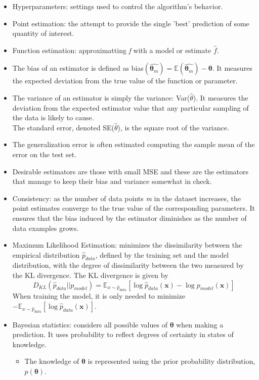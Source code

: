 \documentclass{article}
\begin{document}
\begin{itemize}
\item Hyperparameters: settings used to control the algorithm's behavior.
\item Point estimation: the attempt to provide the single 'best' prediction of some quantity of interest.
\item Function estimation: approximatting \textit{f} with a model or estimate \(\hat{f}\).
\item The bias of an estimator is defined as bias\((\hat{\boldsymbol{\theta}_m}) = \mathbb{E}(\hat{\boldsymbol{\theta}_m}) - \boldsymbol{\theta}\). It measures the expected deviation from the true value of the function or parameter.
\item The variance of an estimator is simply the variance: Var(\(\hat{\theta}\)). It measures the deviation from the expected estimator value that any particular sampling of the data is likely to cause.\\ The standard error, denoted SE(\(\hat{\theta}\)), is the square root of the variance.
\item The generalization error is often estimated computing the sample mean of the error on the test set.
\item Desirable estimators are those with small MSE and these are the estimators that manage to keep their bias and variance somewhat in check.
\item Consistency: as the number of data points \textit{m} in the dataset increases, the point estimates converge to the true value of the corresponding parameters. It ensures that the bias induced by the estimator diminishes as the number of data examples grows.
\item Maximum Likelihood Estimation: minimizes the dissimilarity between the empirical distribution \(\hat{p}_{data}\), defined by the training set and the model distribution, with the degree of dissimilarity between the two measured by the KL divergence. The KL divergence is given by
\[
	D_{KL}(\hat{p}_{data}||p_{model}) = \mathbb{E}_{x\sim \hat{p}_{data}}[\log{\hat{p}_{data}}(\boldsymbol{x}) - \log{p_{model}(\boldsymbol{x})}]
\]
When training the model, it is only needed to minimize \(-\mathbb{E}_{x\sim \hat{p}_{data}}[\log{\hat{p}_{data}}(\boldsymbol{x})]\).
\item Bayesian statistics: considers all possible values of \(\boldsymbol{\theta}\) when making a prediction. It uses probability to reflect degrees of certainty in states of knowledge.
\begin{itemize}
\item The knowledge of \(\boldsymbol{\theta}\) is represented using the prior probability distribution, \(p(\boldsymbol{\theta})\).

\end{itemize}
\end{itemize}
\end{document}
